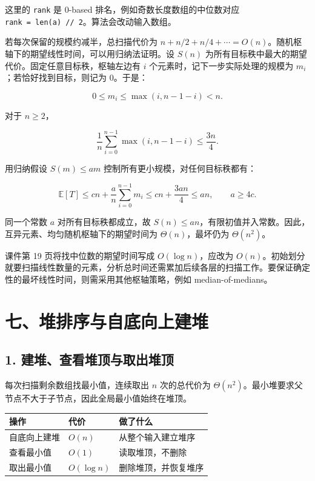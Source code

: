 \documentclass[
  UTF8,fontset=none,zihao=5]{ctexart}
\let\OldSection\section
\renewcommand{\section}{\Needspace{5\baselineskip}\OldSection}
\let\OldSubsection\subsection
\renewcommand{\subsection}{\Needspace{4\baselineskip}\OldSubsection}
\begin{document}
这里的 \texttt{rank} 是 0-based 排名，例如奇数长度数组的中位数对应
\texttt{rank\ =\ len(a)\ //\ 2}。算法会改动输入数组。

若每次保留的规模约减半，总扫描代价为
\(n+n/2+n/4+\cdots=O(n)\)。随机枢轴下的期望线性时间，可以用归纳法证明。设
\(S(n)\) 为所有目标秩中最大的期望代价。固定任意目标秩，枢轴左边有 \(i\)
个元素时，记下一步实际处理的规模为 \(m_i\)；若恰好找到目标，则记为
0。于是：

\[
0\le m_i\le\max(i,n-1-i)<n.
\]

对于 \(n\ge2\)，

\[
\frac1n\sum_{i=0}^{n-1}\max(i,n-1-i)\le\frac{3n}{4}.
\]

用归纳假设 \(S(m)\le am\) 控制所有更小规模，对任何目标秩都有：

\[
\mathbb E[T]\le cn+\frac an\sum_{i=0}^{n-1}m_i
\le cn+\frac{3an}{4}\le an,
\qquad a\ge4c.
\]

同一个常数 \(a\) 对所有目标秩都成立，故
\(S(n)\le an\)，有限初值并入常数。因此，互异元素、均匀随机枢轴下的期望时间为
\(\Theta(n)\)，最坏仍为 \(\Theta(n^2)\)。

课件第 19 页将找中位数的期望时间写成 \(O(\log n)\)，应改为
\(O(n)\)。初始划分就要扫描线性数量的元素，分析总时间还需累加后续各层的扫描工作。要保证确定性的最坏线性时间，则需采用其他枢轴策略，例如
median-of-medians。

\hypertarget{ux4e03ux5806ux6392ux5e8fux4e0eux81eaux5e95ux5411ux4e0aux5efaux5806}{%
\section{七、堆排序与自底向上建堆}\label{ux4e03ux5806ux6392ux5e8fux4e0eux81eaux5e95ux5411ux4e0aux5efaux5806}}

\hypertarget{ux5efaux5806ux67e5ux770bux5806ux9876ux4e0eux53d6ux51faux5806ux9876}{%
\subsection{1.
建堆、查看堆顶与取出堆顶}\label{ux5efaux5806ux67e5ux770bux5806ux9876ux4e0eux53d6ux51faux5806ux9876}}

每次扫描剩余数组找最小值，连续取出 \(n\) 次的总代价为
\(\Theta(n^2)\)。最小堆要求父节点不大于子节点，因此全局最小值始终在堆顶。

\begin{longtable}[]{@{}
  >{\raggedright\arraybackslash}p{}
  >{\raggedright\arraybackslash}p{}
  >{\raggedright\arraybackslash}p{}@{}}
\toprule
操作 & 代价 & 做了什么 \\
\midrule
\endhead
自底向上建堆 & \(O(n)\) & 从整个输入建立堆序 \\
查看最小值 & \(O(1)\) & 读取堆顶，不删除 \\
取出最小值 & \(O(\log n)\) & 删除堆顶，并恢复堆序 \\
\bottomrule
\end{longtable}
\end{document}
